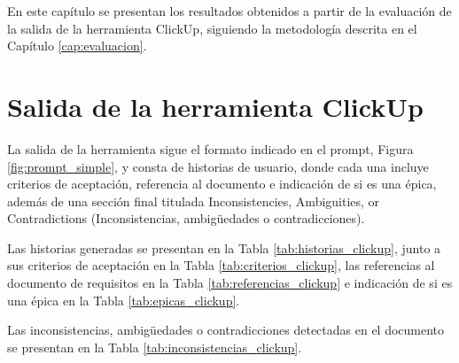 En este capítulo se presentan los resultados obtenidos a partir de la evaluación de la salida de la herramienta ClickUp, siguiendo la metodología descrita en el Capítulo \ref{cap:evaluacion}.

\section{Salida de la herramienta ClickUp}
La salida de la herramienta sigue el formato indicado en el prompt, Figura \ref{fig:prompt_simple}, y consta de historias de usuario, donde cada una incluye criterios de aceptación, referencia al documento e indicación de si es una épica, además de una sección final titulada Inconsistencies, Ambiguities, or Contradictions (Inconsistencias, ambigüedades o contradicciones). 

Las historias generadas se presentan en la Tabla \ref{tab:historias_clickup}, junto a sus criterios de aceptación en la Tabla \ref{tab:criterios_clickup}, las referencias al documento de requisitos en la Tabla \ref{tab:referencias_clickup} e indicación de si es una épica en la Tabla \ref{tab:epicas_clickup}.

Las inconsistencias, ambigüedades o contradicciones detectadas en el documento se presentan en la Tabla \ref{tab:inconsistencias_clickup}.

